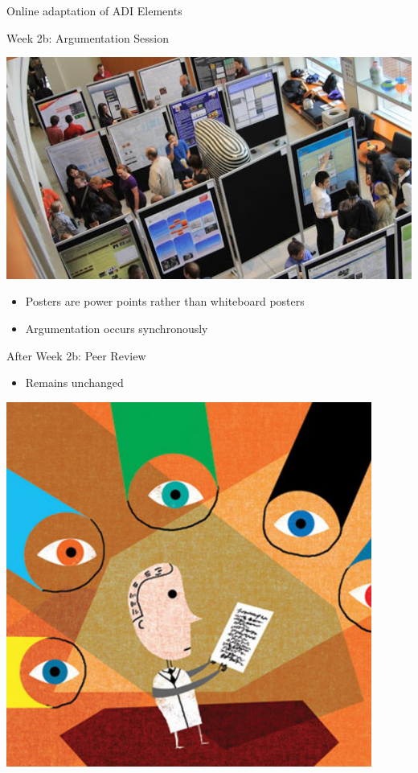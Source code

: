 \documentclass[xcolor=dvipsnames,table]{beamer}
\begin{document}
{\begin{frame}{Online adaptation of ADI Elements}
  \begin{block}{Week 2b: Argumentation Session}
    \begin{minipage}{0.2\textwidth}
      \centering \includegraphics[width=\textwidth]{./clipart/posterSession.jpg}
    \end{minipage}\hfill
    \begin{minipage}{0.75\textwidth}
      \begin{itemize}
        \item Posters are power points rather than whiteboard posters
        \item Argumentation occurs synchronously
      \end{itemize}
    \end{minipage}
  \end{block}
  \begin{block}{After Week 2b: Peer Review}
    \begin{minipage}{0.75\textwidth}
      \begin{itemize}
        \item Remains unchanged
      \end{itemize}
    \end{minipage}\hfill
    \begin{minipage}{0.2\textwidth}
      \centering \includegraphics[width=0.9\textwidth]{./clipart/peerReview.jpg}

\end{minipage}
\end{block}
\end{frame}}
\end{document}
